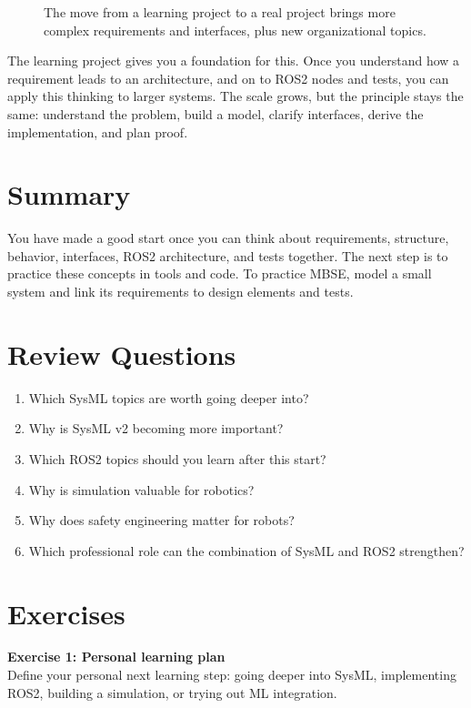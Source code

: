 \begin{figure}[H]
  \centering
  \caption{The move from a learning project to a real project brings more complex requirements and interfaces, plus new organizational topics.}
  \label{fig:kap22-lernprojekt-vs-echtes-projekt}
\end{figure}

The learning project gives you a foundation for this. Once you understand how a requirement leads to an architecture, and on to ROS2 nodes and tests, you can apply this thinking to larger systems. The scale grows, but the principle stays the same: understand the problem, build a model, clarify interfaces, derive the implementation, and plan proof.

\section{Summary}
You have made a good start once you can think about requirements, structure, behavior, interfaces, ROS2 architecture, and tests together. The next step is to practice these concepts in tools and code. To practice MBSE, model a small system and link its requirements to design elements and tests.

\section{Review Questions}
\begin{enumerate}
    \item Which SysML topics are worth going deeper into?
    \item Why is SysML v2 becoming more important?
    \item Which ROS2 topics should you learn after this start?
    \item Why is simulation valuable for robotics?
    \item Why does safety engineering matter for robots?
    \item Which professional role can the combination of SysML and ROS2 strengthen?
\end{enumerate}

\section{Exercises}
\begin{uebungbox}
\textbf{Exercise 1: Personal learning plan}\\
Define your personal next learning step: going deeper into SysML, implementing ROS2, building a simulation, or trying out ML integration.
\end{uebungbox}

